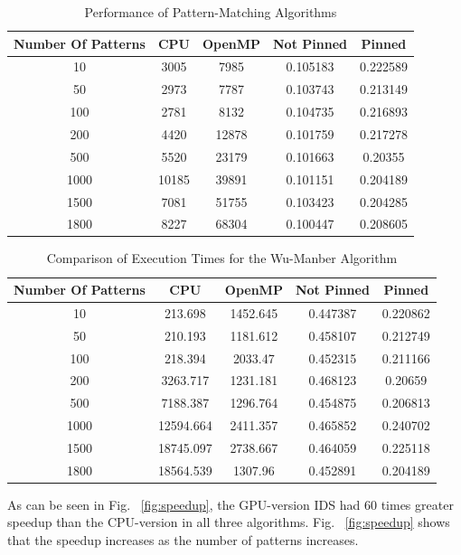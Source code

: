 \begin {table}[H]
\centering
\caption {Performance of Pattern-Matching Algorithms} \label{tab:ahoComparison}
\begin{tabular}{|c|c|c|c|c|}         
	\midrule        
	Number Of Patterns & CPU    & OpenMP &    Not Pinned &    Pinned\\
	\midrule    
	10 &    3005 &    7985 &    0.105183 &    0.222589\\
	\midrule    
	50 &    2973 &    7787 &    0.103743 &    0.213149\\
	\midrule    
	100 &    2781 & 8132 &    0.104735 &    0.216893\\
	\midrule    
	200 &    4420 &    12878 &    0.101759&    0.217278\\
	\midrule    
	500    & 5520 &    23179 &    0.101663 &    0.20355\\
	\midrule    
	1000 &    10185 &    39891 &    0.101151 &    0.204189\\
	\midrule    
	1500 &    7081 &    51755 &    0.103423 &    0.204285\\
	\midrule    
	1800 &    8227 &    68304 &    0.100447 &    0.208605\\
	\midrule
\end{tabular}
\end{table}
\squeezeup
\begin {table}[H]
\centering
\caption {Comparison of Execution Times for the Wu-Manber Algorithm} \label{tab:wuManberComparison}
\begin{tabular}{|c|c|c|c|c|}         
\midrule        
Number Of Patterns & CPU    & OpenMP &    Not Pinned &    Pinned\\
\midrule
10 & 213.698 &    1452.645 &    0.447387 &    0.220862\\
\midrule
50  & 210.193    & 1181.612    & 0.458107    & 0.212749\\
\midrule
100    & 218.394    & 2033.47    & 0.452315    & 0.211166\\
\midrule
200    & 3263.717 &     1231.181 &     0.468123 &     0.20659\\
\midrule
500    &  7188.387 &     1296.764 &     0.454875    & 0.206813\\
\midrule
1000 &     12594.664 &     2411.357 &     0.465852 &     0.240702\\
\midrule
1500 &     18745.097    & 2738.667    & 0.464059 &      0.225118\\
\midrule
1800 &     18564.539    & 1307.96    & 0.452891 &     0.204189\\
\midrule
\end{tabular}
\end{table}
\squeezeup
As can be seen in Fig. ~\ref{fig:speedup}, the GPU-version IDS had 60 times greater speedup than the CPU-version in all three algorithms. Fig. ~\ref{fig:speedup} shows that the speedup increases as the number of patterns increases.  

